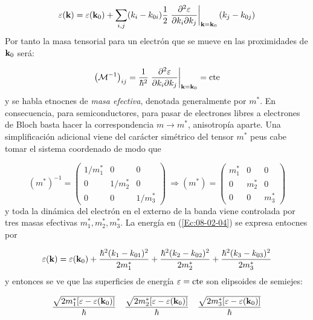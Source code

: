 \begin{equation}
	\varepsilon(\mathbf{k}) = \varepsilon(\mathbf{k}_0) + \sum_{i,j} (k_i - k_{0i}) \frac{1}{2} \left. \frac{\partial ^2 \varepsilon}{\partial  k_i \partial k_j} \right|_{\mathbf{k}=\mathbf{k}_0} (k_j - k_{0j}) \label{Ec:08-02-04}
\end{equation} 
Por tanto la masa tensorial para un electrón que se mueve en las proximidades de $\mathbf{k}_0$ será:

\begin{equation}
	\left( \mathcal{M}^{-1} \right)_{ij} = \frac{1}{\hbar^2} \left. \frac{\partial ^2 \varepsilon}{\partial  k_i \partial k_j} \right|_{\mathbf{k}=\mathbf{k}_0} = \text{cte}
\end{equation}
y se habla etnocnes de \textit{masa efectiva}, denotada generalmente por $m^*$. En consecuencia, para semiconductores, para pasar de electrones libres a electrones de Bloch basta hacer la correspondencia $m\rightarrow m^*$, anisotropía aparte. Una simplificación adicional viene del carácter simétrico del tensor $m^*$ peus cabe tomar el sistema coordenado de modo que

\begin{equation}
	(m^*)^{-1} = \begin{pmatrix}
		1/m_1^* & 0 & 0 \\
		0 & 1/m_2^* & 0 \\
		0 & 0 & 1/m_3^* 
	\end{pmatrix} \ \Rightarrow (m^*) = \begin{pmatrix}
		m_1^* & 0 & 0 \\
		0 & m_2^* & 0 \\
		0 & 0 & m_3^* 
	\end{pmatrix} 
\end{equation}
y toda la dinámica del electrón en el externo de la banda viene controlada por tres masas efectivas $m_1^*,m_2^*,m_3^*$. La energía en (\ref{Ec:08-02-04}) se expresa entocnes por

\begin{equation}
	\varepsilon (\mathbf{k}) = \varepsilon (\mathbf{k}_0) + \frac{\hbar^2 (k_1-k_{01})^2}{2m_1^*} + \frac{\hbar^2 (k_2-k_{02})^2}{2m_2^*} + \frac{\hbar^2 (k_3-k_{03})^2}{2m_3^*}
\end{equation}
y entonces se ve que las superficies de energía $\varepsilon=\text{cte}$ son elipsoides de semiejes:

\begin{equation}
	\frac{\sqrt{2m_1^* [\varepsilon-\varepsilon(\mathbf{k}_0)]}}{\hbar} \quad 
	\frac{\sqrt{2m_2^* [\varepsilon-\varepsilon(\mathbf{k}_0)]}}{\hbar} \quad
	\frac{\sqrt{2m_3^* [\varepsilon-\varepsilon(\mathbf{k}_0)]}}{\hbar}
\end{equation}

